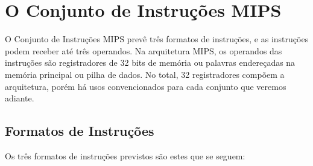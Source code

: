 \chapter{O Conjunto de Instruções MIPS}

O Conjunto de Instruções MIPS prevê três formatos de instruções, e as instruções podem receber até três operandos. Na arquitetura MIPS, os operandos das instruções são registradores de 32 bits de memória ou palavras endereçadas na memória principal ou pilha de dados. No total, 32 registradores compõem a arquitetura, porém há usos convencionados para cada conjunto que veremos adiante.

\section{Formatos de Instruções}

Os três formatos de instruções previstos são estes que se seguem:

